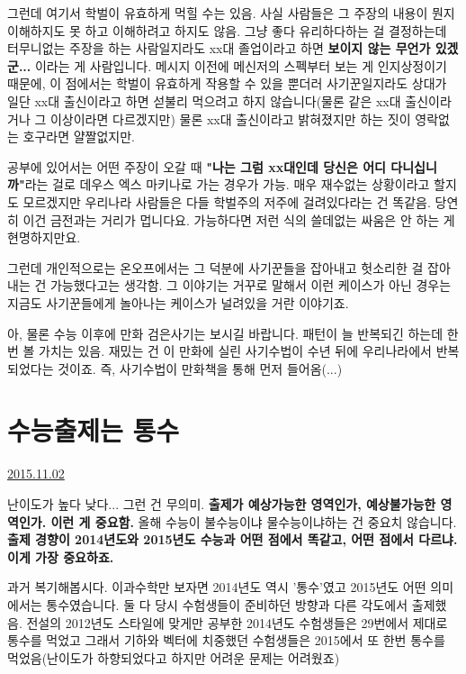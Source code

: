 그런데 여기서 학벌이 유효하게 먹힐 수는 있음.
사실 사람들은 그 주장의 내용이 뭔지 이해하지도 못 하고 이해하려고 하지도 않음. 그냥 좋다 유리하다하는 걸 결정하는데
터무니없는 주장을 하는 사람일지라도 xx대 졸업이라고 하면 \textbf{보이지 않는 무언가 있겠군...} 이라는 게 사람입니다.
메시지 이전에 메신저의 스펙부터 보는 게 인지상정이기 때문에, 이 점에서는 학벌이 유효하게 작용할 수 있을 뿐더러
사기꾼일지라도 상대가 일단 xx대 출신이라고 하면 섣불리 먹으려고 하지 않습니다(물론 같은 xx대 출신이라거나 그 이상이라면 다르겠지만)
물론 xx대 출신이라고 밝혀졌지만 하는 짓이 영락없는 호구라면 얄짤없지만.
\vspace{5mm}

공부에 있어서는 어떤 주장이 오갈 때 \textbf{"나는 그럼 xx대인데 당신은 어디 다니십니까"}라는 걸로 데우스 엑스 마키나로 가는 경우가 가능.
매우 재수없는 상황이라고 할지도 모르겠지만 우리나라 사람들은 다들 학벌주의 저주에 걸려있다라는 건 똑같음.
당연히 이건 금전과는 거리가 멉니다요. 가능하다면 저런 식의 쓸데없는 싸움은 안 하는 게 현명하지만요.
\vspace{5mm}

그런데 개인적으로는 온오프에서는 그 덕분에 사기꾼들을 잡아내고 헛소리한 걸 잡아내는 건 가능했다고는 생각함.
그 이야기는 거꾸로 말해서 이런 케이스가 아닌 경우는 지금도 사기꾼들에게 놀아나는 케이스가 널려있을 거란 이야기죠.
\vspace{5mm}

아, 물론 수능 이후에 만화 검은사기는 보시길 바랍니다. 패턴이 늘 반복되긴 하는데 한번 볼 가치는 있음.
재밌는 건 이 만화에 실린 사기수법이 수년 뒤에 우리나라에서 반복되었다는 것이죠. 즉, 사기수법이 만화책을 통해 먼저 들어옴(...)
\vspace{5mm}






\section{수능출제는 통수}
\href{https://www.kockoc.com/Apoc/461252}{2015.11.02}

\vspace{5mm}

난이도가 높다 낮다... 그런 건 무의미.
\textbf{출제가 예상가능한 영역인가, 예상불가능한 영역인가. 이런 게 중요함.}
올해 수능이 불수능이냐 물수능이냐하는 건 중요치 않습니다.
\textbf{출제 경향이 2014년도와 2015년도 수능과 어떤 점에서 똑같고, 어떤 점에서 다르냐. 이게 가장 중요하죠.}
\vspace{5mm}

과거 복기해봅시다. 이과수학만 보자면 2014년도 역시 '통수'였고 2015년도 어떤 의미에서는 통수였습니다.
둘 다 당시 수험생들이 준비하던 방향과 다른 각도에서 출제했음.
전설의 2012년도 스타일에 맞게만 공부한 2014년도 수험생들은 29번에서 제대로 통수를 먹었고
그래서 기하와 벡터에 치중했던 수험생들은 2015에서 또 한번 통수를 먹었음(난이도가 하향되었다고 하지만 어려운 문제는 어려웠죠)
\vspace{5mm}

